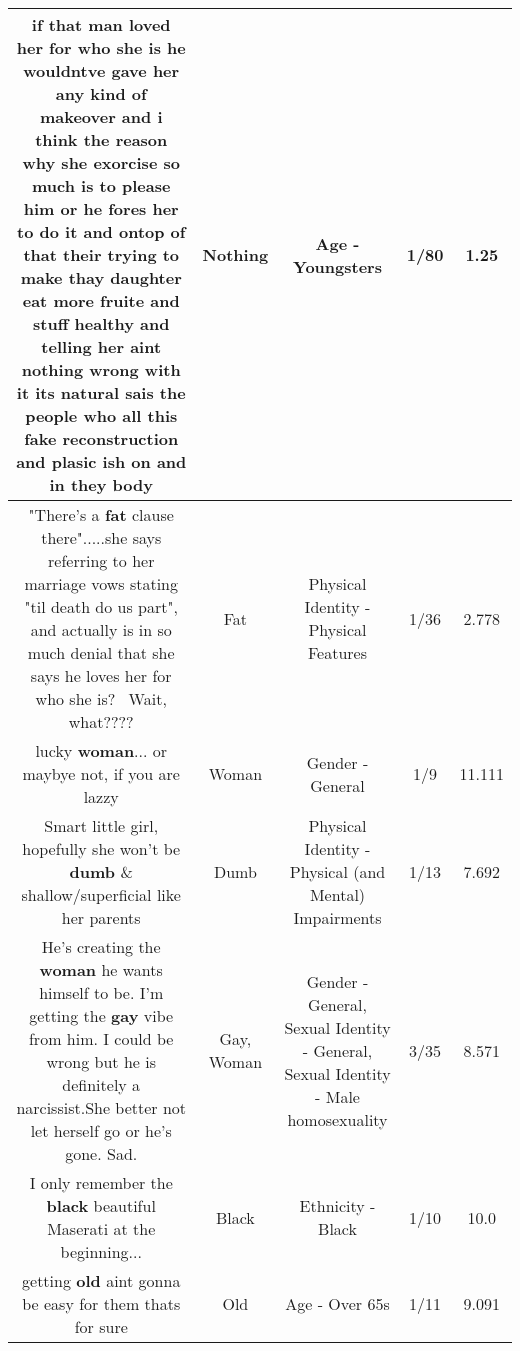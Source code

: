 \documentclass[11pt]{article}
\newlength\mylength
\begin{document}
\begin{center}
\begin{longtable}{|C{.65\mylength}|C{.30\mylength}|C{.12\mylength}|C{.12\mylength}|C{.12\mylength}|}
  \small if that man loved her for who she is he wouldntve gave her any kind of makeover and i think the reason why she exorcise so much is to please him or he fores her to do it and ontop of that their trying to make thay daughter eat more fruite and stuff healthy and telling her aint \textbf{nothing} wrong with it its natural sais the people who all this fake reconstruction and plasic ish on and in they body\normalsize   & Nothing & Age - Youngsters & 1/80 & 1.25 \\  \hline
  \small "There's a \textbf{fat} clause there".....she says referring to her marriage vows stating "til death do us part", and actually is in so much denial that she says he loves her for who she is?  Wait, what????\normalsize   & Fat & Physical Identity - Physical Features & 1/36 & 2.778 \\  \hline
  \small lucky \textbf{woman}... or maybye not, if you are lazzy\normalsize   & Woman & Gender - General & 1/9 & 11.111 \\  \hline
  \small Smart little girl, hopefully she won't be \textbf{dumb} \& shallow/superficial like her parents\normalsize   & Dumb & Physical Identity - Physical (and Mental) Impairments & 1/13 & 7.692 \\  \hline
  \small He's creating the \textbf{woman} he wants himself to be. I'm getting the \textbf{g\textbf{ay}} vibe from him. I could be wrong but he is definitely a narcissist.She better not let herself go or he's gone. Sad.\normalsize   & Gay, Woman & Gender - General, Sexual Identity - General, Sexual Identity - Male homosexuality & 3/35 & 8.571 \\  \hline
  \small I only remember the \textbf{black} beautiful Maserati at the beginning...\normalsize   & Black & Ethnicity - Black & 1/10 & 10.0 \\  \hline
  \small getting \textbf{old} aint gonna be easy for them thats for sure\normalsize   & Old & Age - Over 65s & 1/11 & 9.091 \\  \hline

\end{longtable}
\end{center}
\end{document}
